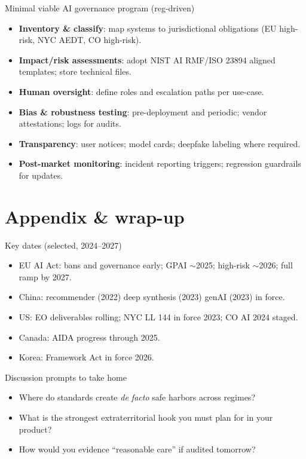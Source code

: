 \documentclass[aspectratio=169]{beamer}
\begin{document}
\begin{frame}{Minimal viable AI governance program (reg-driven)}
\begin{itemize}
  \item \textbf{Inventory \& classify}: map systems to jurisdictional obligations (EU high-risk, NYC AEDT, CO high-risk).
  \item \textbf{Impact/risk assessments}: adopt NIST AI RMF/ISO 23894 aligned templates; store technical files.
  \item \textbf{Human oversight}: define roles and escalation paths per use-case.
  \item \textbf{Bias \& robustness testing}: pre-deployment and periodic; vendor attestations; logs for audits.
  \item \textbf{Transparency}: user notices; model cards; deepfake labeling where required.
  \item \textbf{Post-market monitoring}: incident reporting triggers; regression guardrails for updates.
\end{itemize}
\end{frame}

\section{Appendix \& wrap-up}

\begin{frame}{Key dates (selected, 2024--2027)}
\begin{itemize}
  \item EU AI Act: bans and governance early; GPAI $\sim$2025; high-risk $\sim$2026; full ramp by 2027.
  \item China: recommender (2022) \textrightarrow{} deep synthesis (2023) \textrightarrow{} genAI (2023) in force.
  \item US: EO deliverables rolling; NYC LL 144 in force 2023; CO AI 2024 staged.
  \item Canada: AIDA progress through 2025.
  \item Korea: Framework Act in force 2026.
\end{itemize}
\end{frame}

\begin{frame}{Discussion prompts to take home}
\begin{itemize}
  \item Where do standards create \emph{de facto} safe harbors across regimes?
  \item What is the strongest extraterritorial hook you must plan for in your product?
  \item How would you evidence ``reasonable care'' if audited tomorrow?
\end{itemize}
\end{frame}
\end{document}
